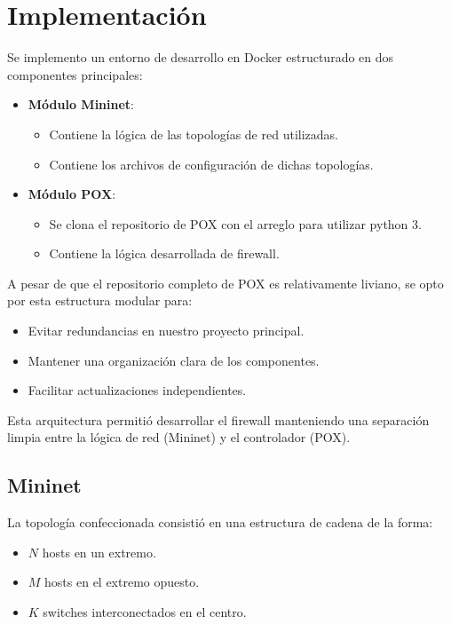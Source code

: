 \section{Implementación}

Se implemento un entorno de desarrollo en Docker estructurado en dos componentes principales:

\begin{itemize}
    \item \textbf{Módulo Mininet}:
    \begin{itemize}
        \item Contiene la lógica de las topologías de red utilizadas.
        \item Contiene los archivos de configuración de dichas topologías.
    \end{itemize}
    
    \item \textbf{Módulo POX}:
    \begin{itemize}
        \item Se clona el repositorio de POX con el arreglo para utilizar python 3.
        \item Contiene la lógica desarrollada de firewall.
    \end{itemize}
\end{itemize}

A pesar de que el repositorio completo de POX es relativamente liviano, se opto por esta estructura modular para:

\begin{itemize}
    \item Evitar redundancias en nuestro proyecto principal.
    \item Mantener una organización clara de los componentes.
    \item Facilitar actualizaciones independientes.
\end{itemize}

Esta arquitectura permitió desarrollar el firewall manteniendo una separación limpia entre la lógica de red (Mininet) y el controlador (POX).

\subsection{Mininet}
La topología confeccionada consistió en una estructura de cadena de la forma:
\begin{itemize}
    \item $N$ hosts en un extremo.
    \item $M$ hosts en el extremo opuesto.
    \item $K$ switches interconectados en el centro.
\end{itemize}

